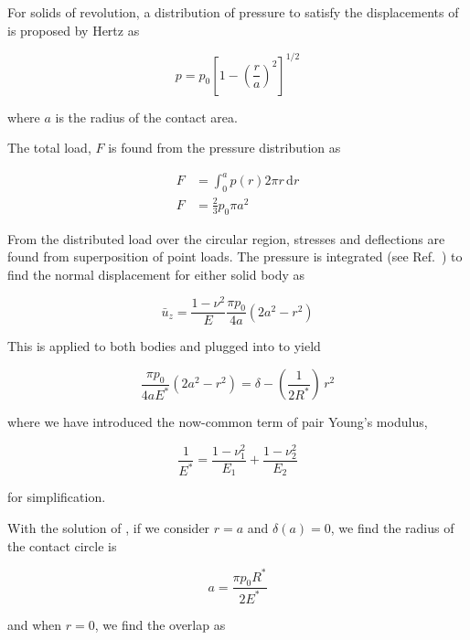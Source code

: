 For solids of revolution, a distribution of pressure to satisfy the displacements of  is proposed by Hertz as

\begin{equation}
	p = p_0 \left[1-\left(\frac{r}{a}\right)^2\right]^{1/2}
\end{equation}

where $a$ is the radius of the contact area.

The total load, $F$ is found from the pressure distribution as

\begin{align}
	F &= \int_0^a \! p(r) 2\pi r\, \mathrm{d}r \nonumber\\
	F & = \frac{2}{3} p_0 \pi a^2\label{eq:hertzforcewithpressure}
\end{align}

From the distributed load over the circular region, stresses and deflections are found from superposition of point loads. The pressure is integrated (see Ref.~\cite{Johnson1985}) to find the normal displacement for either solid body as

\begin{equation}
	\bar{u}_z = \frac{1-\nu^2}{E}\frac{\pi p_0}{4a}\left(2a^2 - r^2\right)
\end{equation}

This is applied to both bodies and plugged into  to yield

\begin{equation}\label{eq:pressindisplacement}
	\frac{\pi p_0}{4aE^*}\left(2a^2 - r^2\right) = \delta - \left(\frac{1}{2R^*}\right)\, r^2
\end{equation}

where we have introduced the now-common term of pair Young's modulus,

\begin{equation}
	\frac{1}{E^*} = \frac{1-\nu_1^2}{E_1} + \frac{1-\nu_2^2}{E_2}
\end{equation}

for simplification.

With the solution of , if we consider $r = a$ and $\delta(a) = 0$, we find the radius of the contact circle is

\begin{equation}\label{eq:hertz-radius}
	a = \frac{\pi p_0 R^*}{2E^*}
\end{equation}

and when $r= 0$, we find the overlap as

